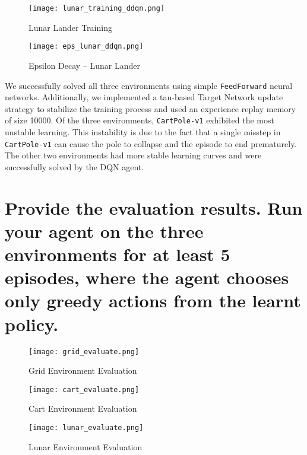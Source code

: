 \documentclass{article} %
\begin{document}
\begin{figure}[H]
    \begin{center}
        \texttt{[image: lunar\_training\_ddqn.png]}
    \end{center}
    \caption{Lunar Lander Training}
\end{figure}

\begin{figure}[H]
    \begin{center}
        \texttt{[image: eps\_lunar\_ddqn.png]}
    \end{center}
    \caption{Epsilon Decay -- Lunar Lander}
\end{figure}

We successfully solved all three environments using simple \verb|FeedForward| neural networks. Additionally, we implemented a tau-based Target Network update strategy to stabilize the training process and used an experience replay memory of size 10000. Of the three environments, \verb|CartPole-v1| exhibited the most unstable learning. This instability is due to the fact that a single misstep in \verb|CartPole-v1| can cause the pole to collapse and the episode to end prematurely. The other two environments had more stable learning curves and were successfully solved by the DQN agent.

\section{Provide the evaluation results. Run your agent on the three environments for at least 5 episodes, where the agent chooses only greedy actions from the learnt policy.}

\begin{figure}[H]
    \begin{center}
        \texttt{[image: grid\_evaluate.png]}
    \end{center}
    \caption{Grid Environment Evaluation}
\end{figure}

\begin{figure}[H]
    \begin{center}
        \texttt{[image: cart\_evaluate.png]}
    \end{center}
    \caption{Cart Environment Evaluation}
\end{figure}

\begin{figure}[H]
    \begin{center}
        \texttt{[image: lunar\_evaluate.png]}
    \end{center}
    \caption{Lunar Environment Evaluation}
\end{figure}
\end{document}
